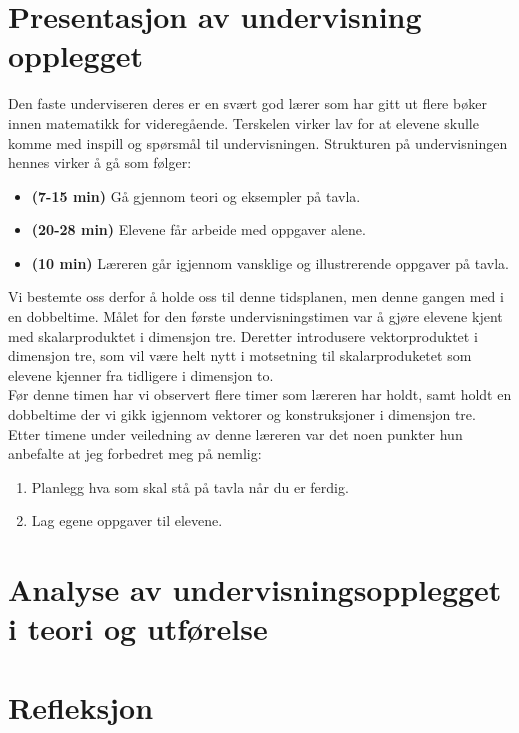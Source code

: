 \documentclass[11pt]{article}
\begin{document}
\section{Presentasjon av undervisning opplegget}
\label{sec-2}
Den faste underviseren deres er en svært god lærer som har gitt ut flere bøker innen matematikk for videregående. Terskelen virker lav for at elevene skulle  komme med inspill og spørsmål til undervisningen. 
Strukturen på undervisningen hennes virker å gå som følger:
\begin{itemize}
\item \textbf{(7-15 min)} Gå gjennom teori og eksempler på tavla.
\item \textbf{(20-28 min)} Elevene får arbeide med oppgaver alene.
\item \textbf{(10 min)} Læreren går igjennom vansklige og illustrerende oppgaver på tavla.
\end{itemize}
Vi bestemte oss derfor å holde oss til denne tidsplanen, men denne gangen med i en dobbeltime. 
Målet for den første undervisningstimen var å gjøre elevene kjent med skalarproduktet i dimensjon tre. Deretter introdusere vektorproduktet i dimensjon tre, som vil være helt nytt i motsetning til skalarproduketet som elevene kjenner fra tidligere i dimensjon to.\\

Før denne timen har vi observert flere timer som læreren har holdt, samt holdt en dobbeltime der vi gikk igjennom vektorer og konstruksjoner i dimensjon tre.\\
Etter  timene under veiledning av denne læreren var det noen punkter hun anbefalte at jeg forbedret meg på nemlig:
\begin{enumerate}
\item Planlegg hva som skal stå på tavla når du er ferdig.
\item Lag egene oppgaver til elevene.
\end{enumerate}




\section{Analyse av undervisningsopplegget i teori og utførelse}
\label{sec-3}



\section{Refleksjon}
\label{sec-4}
\newpage

\end{document}
